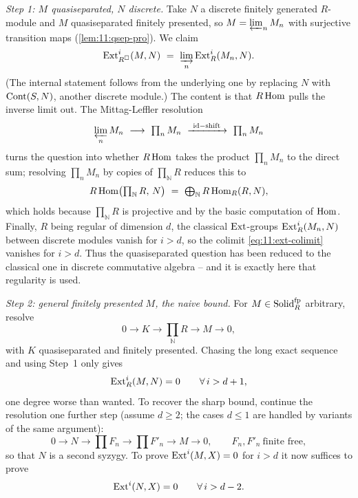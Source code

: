 \emph{Step 1: $M$ quasiseparated, $N$ discrete.} Take $N$ a discrete finitely
generated $R$-module and $M$ quasiseparated finitely presented, so
$M=\varprojlim_{n}M_{n}$ with surjective transition maps
(\cref{lem:11:qsep-pro}). We claim
\begin{equation}
\label{eq:11:ext-colimit}
\Ext^{i}_{R^{\solid}}(M,N)\ =\ \varinjlim_{n}\Ext^{i}_{R}(M_{n},N).
\end{equation}
(The internal statement follows from the underlying one by replacing $N$ with
$\operatorname{Cont}(S,N)$, another discrete module.) The content is that $R\operatorname{Hom}$ pulls the
inverse limit out. The Mittag-Leffler resolution
\begin{equation*}
\varprojlim_{n}M_{n}\ \longrightarrow\ \textstyle\prod_{n}M_{n}\
\xrightarrow{\ \mathrm{id}-\mathrm{shift}\ }\ \textstyle\prod_{n}M_{n}
\end{equation*}
turns the question into whether $R\operatorname{Hom}$ takes the product $\prod_{n}M_{n}$ to
the direct sum; resolving $\prod_{n}M_{n}$ by copies of $\prod_{\mathbb{N}}R$
reduces this to
\begin{equation*}
R\Homop\bigl(\textstyle\prod_{\mathbb{N}}R,\,N\bigr)\ =\ \bigoplus_{\mathbb{N}}
R\Homop_{R}(R,N),
\end{equation*}
which holds because $\prod_{\mathbb{N}}R$ is projective and by the basic
computation of $\operatorname{Hom}$. Finally, $R$ being regular of dimension $d$, the
classical $\operatorname{Ext}$-groups $\operatorname{Ext}^{i}_{R}(M_{n},N)$ between discrete modules vanish
for $i>d$, so the colimit \eqref{eq:11:ext-colimit} vanishes for $i>d$. Thus
the quasiseparated question has been reduced to the classical one in discrete
commutative algebra -- and it is exactly here that regularity is used.

\emph{Step 2: general finitely presented $M$, the naive bound.} For
$M\in\mathrm{Solid}_{R}^{\mathrm{fp}}$ arbitrary, resolve
\begin{equation*}
0\to K\to\textstyle\prod_{\mathbb{N}}R\to M\to 0,
\end{equation*}
with $K$ quasiseparated and finitely presented. Chasing the long exact
sequence and using Step~1 only gives
\begin{equation*}
\operatorname{Ext}^{i}_{R}(M,N)=0\qquad\forall\,i>d+1,
\end{equation*}
one degree worse than wanted. To recover the sharp bound, continue the
resolution one further step (assume $d\ge 2$; the cases $d\le 1$ are handled by
variants of the same argument):
\begin{equation*}
0\to N\to\textstyle\prod F_{n}\to\textstyle\prod F'_{n}\to M\to 0,
\qquad F_{n},F'_{n}\ \text{finite free},
\end{equation*}
so that $N$ is a second syzygy. To prove $\operatorname{Ext}^{i}(M,X)=0$ for $i>d$ it now
suffices to prove
\begin{equation}
\label{eq:11:suffices-syzygy}
\operatorname{Ext}^{i}(N,X)=0\qquad\forall\,i>d-2.
\end{equation}

